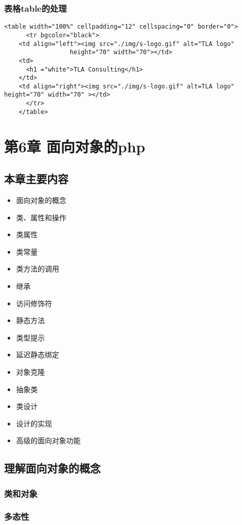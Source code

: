 \documentclass[11pt]{article}
\begin{document}
\subsubsection{表格table的处理}
\label{sec:org0439576}
\begin{verbatim}
<table width="100%" cellpadding="12" cellspacing="0" border="0">
      <tr bgcolor="black">
	<td align="left"><img src="./img/s-logo.gif" alt="TLA logo"
			      height="70" width="70"></td>
	<td>
	  <h1 ="white">TLA Consulting</h1>
	</td>
	<td align="right"><img src="./img/s-logo.gif" alt=TLA logo" height="70" width="70" ></td>
      </tr>
    </table>
\end{verbatim}

\section{第6章 面向对象的php}
\label{sec:orgd46174d}
\subsection{本章主要内容}
\label{sec:org4423ec6}
\begin{itemize}
\item 面向对象的概念
\item 类、属性和操作
\item 类属性
\item 类常量
\item 类方法的调用
\item 继承
\item 访问修饰符
\item 静态方法
\item 类型提示
\item 延迟静态绑定
\item 对象克隆
\item 抽象类
\item 类设计
\item 设计的实现
\item 高级的面向对象功能
\end{itemize}
\subsection{理解面向对象的概念}
\label{sec:orga7e190d}
\subsubsection{类和对象}
\label{sec:org6f2df3f}
\subsubsection{多态性}
\label{sec:orgef82f1d}
\end{document}
